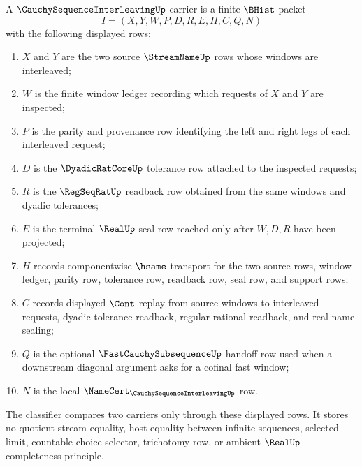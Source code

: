 \begin{definition}
\label{def:cauchy-sequence-interleaving-carrier}
A $\CauchySequenceInterleavingUp$ carrier is a finite $\BHist$ packet
$$
I=(X,Y,W,P,D,R,E,H,C,Q,N)
$$
with the following displayed rows:
\begin{enumerate}
\item $X$ and $Y$ are the two source $\StreamNameUp$ rows whose windows are interleaved;
\item $W$ is the finite window ledger recording which requests of $X$ and $Y$ are inspected;
\item $P$ is the parity and provenance row identifying the left and right legs of each interleaved request;
\item $D$ is the $\DyadicRatCoreUp$ tolerance row attached to the inspected requests;
\item $R$ is the $\RegSeqRatUp$ readback row obtained from the same windows and dyadic tolerances;
\item $E$ is the terminal $\RealUp$ seal row reached only after $W,D,R$ have been projected;
\item $H$ records componentwise $\hsame$ transport for the two source rows, window ledger, parity row, tolerance row, readback row, seal row, and support rows;
\item $C$ records displayed $\Cont$ replay from source windows to interleaved requests, dyadic tolerance readback, regular rational readback, and real-name sealing;
\item $Q$ is the optional $\FastCauchySubsequenceUp$ handoff row used when a downstream diagonal argument asks for a cofinal fast window;
\item $N$ is the local $\NameCert_{\CauchySequenceInterleavingUp}$ row.
\end{enumerate}
The classifier compares two carriers only through these displayed rows. It stores no quotient stream equality, host equality between infinite sequences, selected limit, countable-choice selector, trichotomy row, or ambient $\RealUp$ completeness principle.
\end{definition}

